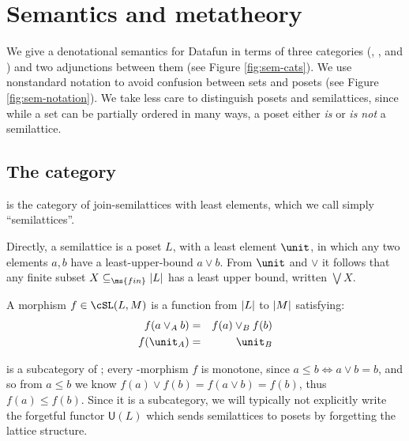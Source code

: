 
\section{Semantics and metatheory}
\label{sec:semantics}

We give a denotational semantics for Datafun in terms of three categories
(\cSet{}, \cPoset{}, and \cSL{}) and two adjunctions between them (see Figure
\ref{fig:sem-cats}). We use nonstandard notation to avoid confusion between sets
and posets (see Figure \ref{fig:sem-notation}). We take less care to distinguish
posets and semilattices, since while a set can be partially ordered in many
ways, a poset either \emph{is} or \emph{is not} a semilattice.

\subsection{The category \cSL{}}

\cSL{} is the category of join-semilattices with least elements, which we call
simply ``semilattices''.

Directly, a semilattice is a poset $L$, with a least element $\unit$, in which
any two elements $a,b$ have a least-upper-bound $a \vee b$. From $\unit$ and
$\vee$ it follows that any finite subset $X \subseteq_{\ms{fin}} \U{L}$ has a
least upper bound, written $\bigvee X$.

A morphism $f \in \cSL(L, M)$ is a function from $|L|$ to $|M|$ satisfying:
\begin{eqnarray*}
  f(a \vee_A b) &=& f(a) \vee_B f(b)\\
  f(\unit_A) &=& \unit_B
\end{eqnarray*}

\cSL{} is a subcategory of ; every \cSL{}-morphism $f$ is monotone,
since $a \le b \iff a \vee b = b$, and so from $a \le b$ we know $f(a) \vee f(b)
= f(a \vee b) = f(b)$, thus $f(a) \le f(b)$. Since it is a subcategory, we will
typically not explicitly write the forgetful functor $\mathsf{U}(L)$ which sends
semilattices to posets by forgetting the lattice structure.


